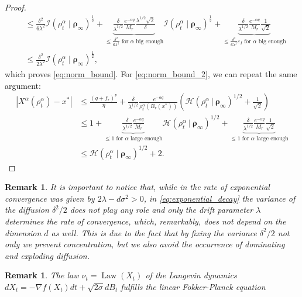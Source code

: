 \documentclass[reqno]{amsart}
\numberwithin{algorithm}{section}
\newcommand{\Xalpha}{{X^\alpha}}
\newtheorem{remark}[theorem]{Remark}
\begin{document}
{\begin{proof}
\begin{align*}
        &\leq \frac{\delta^2}{6\lambda^2} \mathcal I(\rho^\alpha_t \mid \boldsymbol\rho_\infty)^{\frac{1}{2}} + \underbrace{\frac{\delta}{\lambda^{1/2}}\frac{e^{-\alpha q}}{M_r} \frac{\lambda^{1/2}\sqrt{2}}{\delta}}_{\leq \frac{\delta^2}{6\lambda^2} \text{ for } \alpha \text{ big enough}}\mathcal I(\rho^\alpha_t \mid \boldsymbol\rho_\infty)^{\frac{1}{2}} + \underbrace{\frac{\delta}{\lambda^{1/2}}\frac{e^{-\alpha q}}{M_r}\frac{1}{\sqrt{2}}}_{\leq \frac{\delta^2}{6\lambda^2} \varepsilon_I \text{ for } \alpha \text{ big enough}} \\
        &\leq \frac{\delta^2}{2\lambda^2} \mathcal I(\rho^\alpha_t \mid \boldsymbol\rho_\infty)^{\frac{1}{2}},
    \end{align*}
    which proves \cref{eq:norm_bound}. For \cref{eq:norm_bound_2}, we can repeat the same argument:
    \begin{align*}
        |\Xalpha(\rho^\alpha_t) - x^*| &\leq\frac{(q+ f_r)^\nu}{\eta} + \frac{\delta}{\lambda^{1/2}}\frac{e^{-\alpha q}}{\rho^\alpha_t(B_r(x^*))}\left(\mathcal H(\rho^\alpha_t\ |\ \boldsymbol\rho_\infty)^{1/2} + \frac{1}{\sqrt{2}}\right) \\
        &\leq 1 + \underbrace{\frac{\delta}{\lambda^{1/2}}\frac{e^{-\alpha q}}{M_r} }_{\leq 1 \text{ for } \alpha \text{ large enough}}\mathcal H(\rho^\alpha_t\ |\ \boldsymbol\rho_\infty)^{1/2} + \underbrace{\frac{\delta}{\lambda^{1/2}}\frac{e^{-\alpha q}}{M_r}\frac{1}{\sqrt{2}}}_{\leq 1 \text{ for } \alpha \text{ large enough}} \\
        &\leq \mathcal H(\rho^\alpha_t \mid \boldsymbol\rho_\infty)^{1/2} + 2.
    \end{align*}
\end{proof}
\begin{remark}
    It is important to notice that, while in \cite[Theorem 3.7]{B1-fornasier2021global} the rate of exponential convergence was given by $2 \lambda - d \sigma^2 >0$,  in \eqref{eq:exponential_decay} the  variance of the diffusion $\delta^2/2$ does not play any  role and only the drift parameter $\lambda$ determines the rate of convergence, which, remarkably, does not depend on the dimension $d$ as well. This is due to the fact that by fixing the variance $\delta^2/2$ not only we prevent concentration, but we also avoid the occurrence of dominating and exploding diffusion.
\end{remark}
\begin{remark}
The law $\nu_t = \operatorname{Law}(X_t)$ of the Langevin dynamics $d X_t = - \nabla f(X_t) dt + \sqrt{2 \sigma} dB_t$ fulfills the linear Fokker-Planck equation

\end{remark}}
\end{document}

